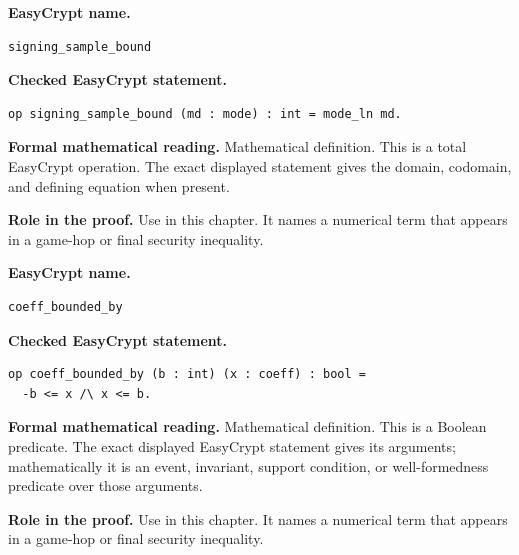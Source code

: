 \begin{formaldefinition}
\noindent\textbf{EasyCrypt name.}
\begin{lstlisting}[language=EasyCrypt,basicstyle=\ttfamily\scriptsize]
signing_sample_bound
\end{lstlisting}
\noindent\textbf{Checked EasyCrypt statement.}
\begin{lstlisting}[language=EasyCrypt,basicstyle=\ttfamily\scriptsize]
op signing_sample_bound (md : mode) : int = mode_ln md.
\end{lstlisting}
\noindent\textbf{Formal mathematical reading.}
Mathematical definition. This is a total EasyCrypt operation.  The exact displayed statement gives the domain, codomain, and defining equation when present.

\noindent\textbf{Role in the proof.}
Use in this chapter. It names a numerical term that appears in a game-hop or final security inequality.

\end{formaldefinition}

\begin{formaldefinition}
\noindent\textbf{EasyCrypt name.}
\begin{lstlisting}[language=EasyCrypt,basicstyle=\ttfamily\scriptsize]
coeff_bounded_by
\end{lstlisting}
\noindent\textbf{Checked EasyCrypt statement.}
\begin{lstlisting}[language=EasyCrypt,basicstyle=\ttfamily\scriptsize]
op coeff_bounded_by (b : int) (x : coeff) : bool =
  -b <= x /\ x <= b.
\end{lstlisting}
\noindent\textbf{Formal mathematical reading.}
Mathematical definition. This is a Boolean predicate.  The exact displayed EasyCrypt statement gives its arguments; mathematically it is an event, invariant, support condition, or well-formedness predicate over those arguments.

\noindent\textbf{Role in the proof.}
Use in this chapter. It names a numerical term that appears in a game-hop or final security inequality.

\end{formaldefinition}

